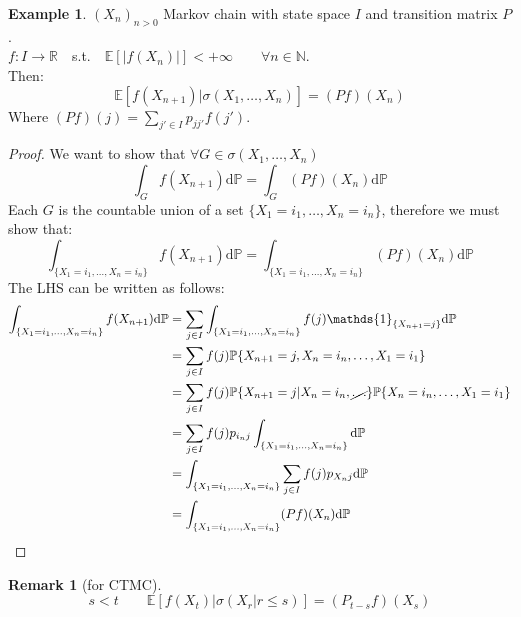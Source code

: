 \documentclass[10pt,a4paper]{article}
\theoremstyle{definition}
\newtheorem{exi}{Example}[section]
\newtheorem*{rem}{Remark}
\newcommand{\ind}{\mathds{1}}
\begin{document}
\begin{exi}
	$(X_n)_{n>0}$ Markov chain with state space $I$ and transition matrix $P$.\\
	$f:I\to\mathbb{R} \quad$s.t.$\quad\mathbb{E}[|f(X_n)|]<+\infty \qquad \forall n\in\mathbb{N}$.\\ Then:
	\begin{equation*}
		\mathbb{E}[f(X_{n+1})|\sigma(X_1,\ldots,X_n)]=(Pf)(X_n)
	\end{equation*}
Where $(Pf)(j)=\sum_{j'\in I}p_{jj'}f(j')$.
\begin{proof}
	We want to show that $\forall G \in \sigma(X_1,\ldots,X_n)$
	\begin{equation*}
		\int_{G}f(X_{n+1})\mathrm{d}\mathbb{P}=\int_{G}(Pf)(X_n)\mathrm{d}\mathbb{P}
	\end{equation*}
Each $G$ is the countable union of a set $\{X_1=i_1,\ldots,X_n=i_n\}$, therefore we must show that:
\begin{equation*}
	\int_{\{X_1=i_1,\ldots,X_n=i_n\}}f(X_{n+1})\mathrm{d}\mathbb{P}=\int_{\{X_1=i_1,\ldots,X_n=i_n\}}(Pf)(X_n)\mathrm{d}\mathbb{P}
\end{equation*}
The LHS can be written as follows:
\begin{equation*}
	\begin{split}
		\int_{\{X_1=i_1,\ldots,X_n=i_n\}}f(X_{n+1})\mathrm{d}\mathbb{P}&=\sum_{j\in I}\int_{\{X_1=i_1,\ldots,X_n=i_n\}}f(j)\ind_{\{X_{n+1}=j\}}\mathrm{d}\mathbb{P} \\
		&=\sum_{j\in I}f(j)\mathbb{P}\{X_{n+1}=j,X_n=i_n,\ldots,X_1=i_1\}\\
		&=\sum_{j\in I}f(j)\mathbb{P}\{X_{n+1}=j|X_n=i_n,\cancel{\ldots}\}\mathbb{P}\{X_n=i_n,\ldots,X_1=i_1\} \\
		&=\sum_{j\in I}f(j)p_{i_n j}\int_{\{X_1=i_1,\ldots,X_n=i_n\}}\mathrm{d}\mathbb{P} \\
		&=\int_{\{X_1=i_1,\ldots,X_n=i_n\}}\sum_{j\in I}f(j)p_{X_n j}\mathrm{d}\mathbb{P} \\
		&=\int_{\{X_1=i_1,\ldots,X_n=i_n\}}(Pf)(X_n)\mathrm{d}\mathbb{P}
	\end{split}
\end{equation*}
\end{proof}
\end{exi}
\begin{rem}[for CTMC]
	\begin{equation*}
		s<t \qquad \mathbb{E}[f(X_t)|\sigma(X_r|r\leq s)]=(P_{t-s}f)(X_s)
	\end{equation*}
\end{rem}
\end{document}
